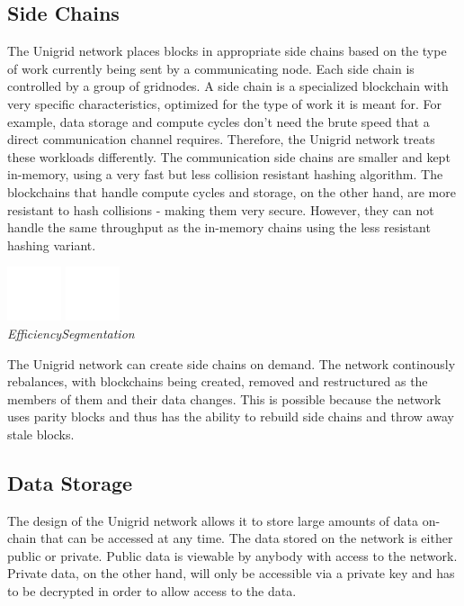 \documentclass[a4paper,oneside]{article}
\begin{document}
\subsection{Side Chains}
The Unigrid network places blocks in appropriate side chains based on the type of work currently being sent by a communicating node. Each side chain is controlled by a group of gridnodes. A side chain is a specialized blockchain with very specific characteristics, optimized for the type of work it is meant for. For example, data storage and compute cycles don't need the brute speed that a direct communication channel requires. Therefore, the Unigrid network treats these workloads differently. The communication side chains are smaller and kept in-memory, using a very fast but less collision resistant hashing algorithm. The blockchains that handle compute cycles and storage, on the other hand, are more resistant to hash collisions - making them very secure. However, they can not handle the same throughput as the in-memory chains using the less resistant hashing variant.

\begin{center}
\vspace{0.1cm}
\includegraphics[width=45pt]{efficiency}
\hspace{1.5cm}
\includegraphics[width=45pt]{segmented}
\\
\vspace{0.1cm}
\hspace{10pt}\emph{Efficiency}\hspace{46pt}\emph{Segmentation}
\end{center}

\noindent The Unigrid network can create side chains on demand. The network continously rebalances, with blockchains being created, removed and restructured as the members of them and their data changes. This is possible because the network uses parity blocks and thus has the ability to rebuild side chains and throw away stale blocks.

\subsection{Data Storage}
The design of the Unigrid network allows it to store large amounts of data on-chain that can be accessed at any time. The data stored on the network is either public or private. Public data is viewable by anybody with access to the network. Private data, on the other hand, will only be accessible via a private key and has to be decrypted in order to allow access to the data.
\end{document}

